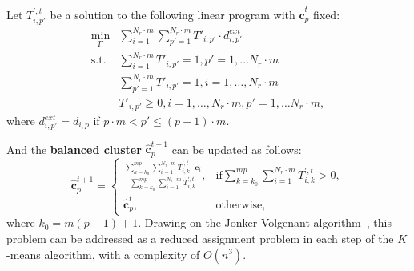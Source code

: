 Let $T_{i,p'}^{',t}$ be a solution to the following linear program with $\hat{\mathbf{c}}_{p}^{t}$ fixed:
\begin{align}
    \min_{T'} &\sum_{i=1}^{N_r\cdot m} \sum_{p'=1}^{N_r\cdot m} T'_{i,p'}\cdot d_{i,p'}^{ext} \\
    \text{s.t.} &\sum_{i=1}^{N_r\cdot m} T'_{i,p'} = 1, p' = 1, \dots N_r\cdot m \nonumber \\
    &\sum_{p'=1}^{N_r\cdot m} T'_{i,p'}=1, i = 1, \dots,N_r\cdot m \nonumber \\
    &T'_{i,p'} \geq 0, i = 1, \dots,N_r\cdot m, p' = 1, \dots N_r \cdot m, \nonumber
\end{align}
where $d_{i,p'}^{ext} = d_{i,p}$ if $p\cdot m < p' \leq (p+1)\cdot m$.

And the \textbf{balanced cluster} $\hat{\mathbf{c}}_{p}^{t+1}$ can be updated as follows:
\begin{equation}
    \hat{\mathbf{c}}_{p}^{t+1} = \scriptstyle\left\{ 
    \begin{array}{ll}
        \frac{\sum\limits_{k = k_0}^{mp}\sum\limits_{i=1}^{N_r\cdot m} T_{i,k}^{',t}\cdot \mathbf{c}_i}{\sum\limits_{k = k_0}^{mp}\sum\limits_{i=1}^{N_r\cdot m}T_{i,k}^{',t}}, 
        &\text{if} \scriptstyle\sum\limits_{k =k_0}^{mp} \sum\limits_{i=1}^{N_r\cdot m}T_{i,k}^{',t} > 0,  \\ 
        \hat{\mathbf{c}}_{p}^{t},   
        &\text{otherwise},
    \end{array}\right.
\end{equation}
where $k_0=m(p-1)+1$. Drawing on the Jonker-Volgenant algorithm~\cite{jonker1988shortest}, this problem can be addressed as a reduced assignment problem in each step of the $K$-means algorithm, with a complexity of $O(n^3)$. 

